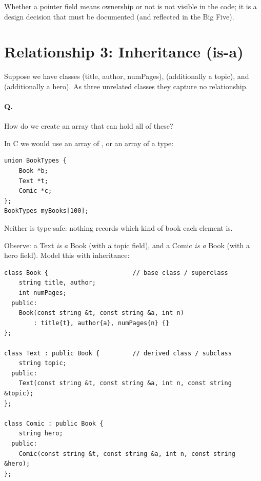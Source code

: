 Whether a pointer field means ownership or not is not visible in the code; it is
a design decision that must be documented (and reflected in the Big Five).

\section{Relationship 3: Inheritance (is-a)}
Suppose we have classes  (title, author, numPages), 
(additionally a topic), and  (additionally a hero). As three
unrelated classes they capture no relationship.

\paragraph{Q.} How do we create an array that can hold all of these?

In C we would use an array of , or an array of a  type:
\begin{lstlisting}[style=cpp]
union BookTypes {
    Book *b;
    Text *t;
    Comic *c;
};
BookTypes myBooks[100];
\end{lstlisting}
Neither is type-safe: nothing records which kind of book each element is.

Observe: a Text \emph{is a} Book (with a topic field), and a Comic \emph{is a}
Book (with a hero field). Model this with inheritance:
\begin{lstlisting}[style=cpp]
class Book {                       // base class / superclass
    string title, author;
    int numPages;
  public:
    Book(const string &t, const string &a, int n)
        : title{t}, author{a}, numPages{n} {}
};

class Text : public Book {         // derived class / subclass
    string topic;
  public:
    Text(const string &t, const string &a, int n, const string &topic);
};

class Comic : public Book {
    string hero;
  public:
    Comic(const string &t, const string &a, int n, const string &hero);
};
\end{lstlisting}

\begin{center}
\end{center}

